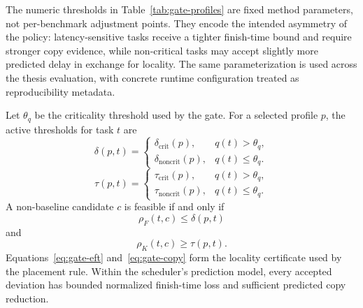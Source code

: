 The numeric thresholds in Table~\ref{tab:gate-profiles} are fixed method parameters, not per-benchmark adjustment points. They encode the intended asymmetry of the policy: latency-sensitive tasks receive a tighter finish-time bound and require stronger copy evidence, while non-critical tasks may accept slightly more predicted delay in exchange for locality. The same parameterization is used across the thesis evaluation, with concrete runtime configuration treated as reproducibility metadata.

Let $\theta_q$ be the criticality threshold used by the gate. For a selected profile $p$, the active thresholds for task $t$ are
\begin{equation}
\delta(p,t)
=
\left\{
\begin{array}{ll}
\delta_{\mathrm{crit}}(p), & q(t)>\theta_q,\\
\delta_{\mathrm{noncrit}}(p), & q(t)\leq\theta_q.
\end{array}
\right.
\end{equation}
\begin{equation}
\tau(p,t)
=
\left\{
\begin{array}{ll}
\tau_{\mathrm{crit}}(p), & q(t)>\theta_q,\\
\tau_{\mathrm{noncrit}}(p), & q(t)\leq\theta_q.
\end{array}
\right.
\end{equation}
A non-baseline candidate $c$ is feasible if and only if
\begin{equation}
\rho_F(t,c)\leq\delta(p,t)
\label{eq:gate-eft}
\end{equation}
and
\begin{equation}
\rho_K(t,c)\geq\tau(p,t).
\label{eq:gate-copy}
\end{equation}
Equations~\ref{eq:gate-eft} and~\ref{eq:gate-copy} form the locality certificate used by the placement rule. Within the scheduler's prediction model, every accepted deviation has bounded normalized finish-time loss and sufficient predicted copy reduction.

